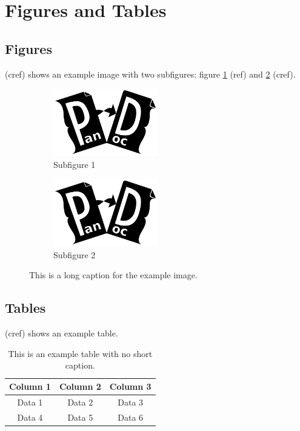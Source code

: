 \documentclass{article}
\begin{document}
\section{Figures and Tables\label{sec:figures_tables}}

\subsection{Figures}
 (cref) shows an example image with two subfigures: figure \ref{fig:subfig1} (ref) and \cref{fig:subfig2} (cref).

\begin{figure}[H]
    \begin{subfigure}[b]{0.5\textwidth}
        \centering
        \includegraphics[width=0.5\textwidth]{./example-image}
        \caption{Subfigure 1}
        \label{fig:subfig1}
    \end{subfigure}
    \begin{subfigure}[b]{0.5\textwidth}
        \centering
        \includegraphics[width=0.5\textwidth]{./example-image}
        \caption{Subfigure 2}
        \label{fig:subfig2}
    \end{subfigure}
    \caption[short caption]{This is a long caption for the example image.}
    \label{fig:example}
\end{figure}

\subsection{Tables}
 (cref) shows an example table.

\begin{table}[H]
    \centering
    \begin{tabular}{|c|c|c|}
        \hline
        Column 1 & Column 2 & Column 3 \\
        \hline
        Data 1 & Data 2 & Data 3 \\
        Data 4 & Data 5 & Data 6 \\
        \hline
    \end{tabular}
    \caption{This is an example table with no short caption.}
    \label{tab:example}
\end{table}
\end{document}
